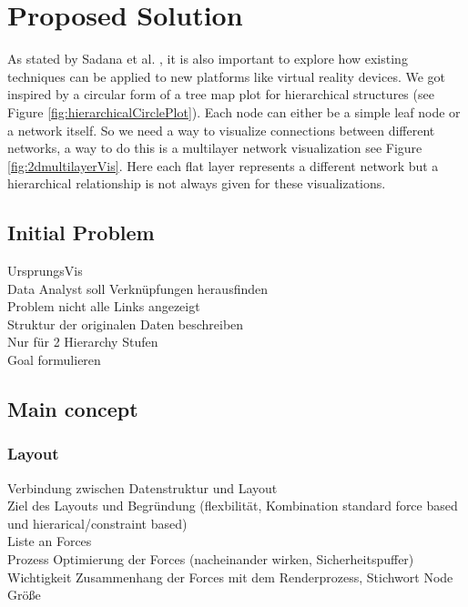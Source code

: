 \chapter{Proposed Solution}


As stated by Sadana et al. \cite{sadana_redefining_2016}, it is also important to explore how existing techniques can be applied to new platforms like virtual reality devices.
We got inspired by a circular form of a tree map plot for hierarchical structures (see Figure \ref{fig:hierarchicalCirclePlot}). Each node can either be a simple leaf node or a network itself. So we need a way to visualize connections between different networks, a way to do this is a multilayer network visualization see Figure \ref{fig:2dmultilayerVis}. Here each flat layer represents a different network but a hierarchical relationship is not always given for these visualizations.  

\section{Initial Problem}

UrsprungsVis\\
Data Analyst soll Verknüpfungen herausfinden\\
Problem nicht alle Links angezeigt\\
Struktur der originalen Daten beschreiben\\
Nur für 2 Hierarchy Stufen\\

Goal formulieren\\

\section{Main concept}

\subsection{Layout}

Verbindung zwischen Datenstruktur und Layout\\
Ziel des Layouts und Begründung (flexbilität, Kombination standard force based und hierarical/constraint based)\\
Liste an Forces\\
Prozess Optimierung der Forces (nacheinander wirken, Sicherheitspuffer)\\
Wichtigkeit Zusammenhang der Forces mit dem Renderprozess, Stichwort Node Größe

